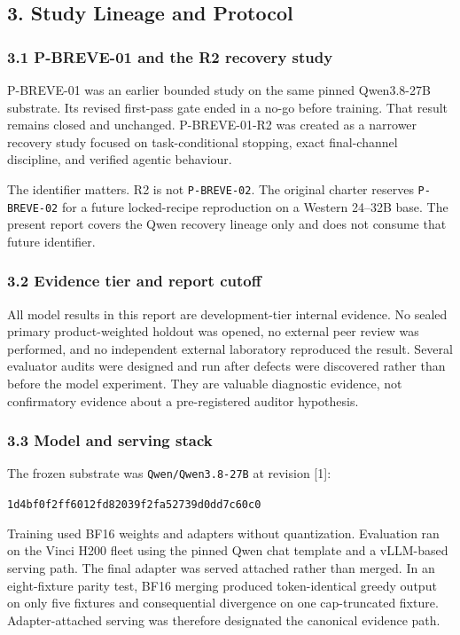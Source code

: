 \documentclass[
]{article}
\begin{document}
\subsection{3. Study Lineage and
Protocol}\label{3-study-lineage-and-protocol}

\subsubsection{3.1 P-BREVE-01 and the R2 recovery
study}\label{31-p-breve-01-and-the-r2-recovery-study}

P-BREVE-01 was an earlier bounded study on the same pinned Qwen3.8-27B
substrate. Its revised first-pass gate ended in a no-go before training.
That result remains closed and unchanged. P-BREVE-01-R2 was created as a
narrower recovery study focused on task-conditional stopping, exact
final-channel discipline, and verified agentic behaviour.

The identifier matters. R2 is not \texttt{P-BREVE-02}. The original
charter reserves \texttt{P-BREVE-02} for a future locked-recipe
reproduction on a Western 24--32B base. The present report covers the
Qwen recovery lineage only and does not consume that future identifier.

\subsubsection{3.2 Evidence tier and report
cutoff}\label{32-evidence-tier-and-report-cutoff}

All model results in this report are development-tier internal evidence.
No sealed primary product-weighted holdout was opened, no external peer
review was performed, and no independent external laboratory reproduced
the result. Several evaluator audits were designed and run after defects
were discovered rather than before the model experiment. They are
valuable diagnostic evidence, not confirmatory evidence about a
pre-registered auditor hypothesis.

\subsubsection{3.3 Model and serving
stack}\label{33-model-and-serving-stack}

The frozen substrate was \texttt{Qwen/Qwen3.8-27B} at revision {[}1{]}:

\texttt{1d4bf0f2ff6012fd82039f2fa52739d0dd7c60c0}

Training used BF16 weights and adapters without quantization. Evaluation
ran on the Vinci H200 fleet using the pinned Qwen chat template and a
vLLM-based serving path. The final adapter was served attached rather
than merged. In an eight-fixture parity test, BF16 merging produced
token-identical greedy output on only five fixtures and consequential
divergence on one cap-truncated fixture. Adapter-attached serving was
therefore designated the canonical evidence path.
\end{document}
